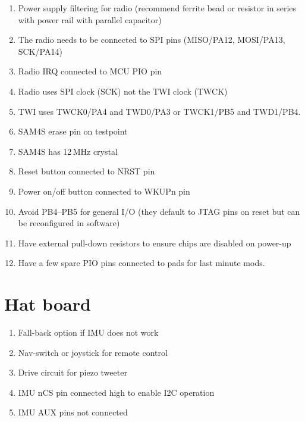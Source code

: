 \documentclass[a4paper, 12pt]{article}
\begin{document}
\begin{enumerate}
\item Power supply filtering for radio (recommend ferrite bead or
  resistor in series with power rail with parallel capacitor)

\item The radio needs to be connected to SPI pins (MISO/PA12,
  MOSI/PA13, SCK/PA14)

\item Radio IRQ connected to MCU PIO pin

\item Radio uses SPI clock (SCK) not the TWI clock (TWCK)

\item TWI uses TWCK0/PA4 and TWD0/PA3 or TWCK1/PB5 and TWD1/PB4.

\item SAM4S erase pin on testpoint

\item SAM4S has 12\,MHz crystal

\item Reset button connected to NRST pin

\item Power on/off button connected to WKUPn pin

\item Avoid PB4--PB5 for general I/O (they default to JTAG pins on
  reset but can be reconfigured in software)

\item Have external pull-down resistors to ensure chips are disabled on
  power-up

\item Have a few spare PIO pins connected to pads for last minute mods.

\end{enumerate}


\section{Hat board}

\begin{enumerate}
\item Fall-back option if IMU does not work

\item Nav-switch or joystick for remote control

\item Drive circuit for piezo tweeter

\item IMU nCS pin connected high to enable I2C operation

\item IMU AUX pins not connected  
  
\end{enumerate}
\end{document}
